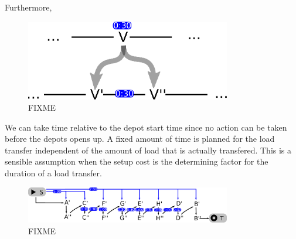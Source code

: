 

Furthermore,

\begin{figure}[!h]
  \centering
    \includegraphics[width=0.8\textwidth]{img/pert.pdf}
  \caption{FIXME}
  \label{fig:duplication}
\end{figure}

We can take time relative to the depot start time since no action can be taken before the depots opens up.
A fixed amount of time is planned for the load transfer independent of the amount of load that is actually transfered.
This is a sensible assumption when the setup cost is the determining factor
for the duration of a load transfer.




\begin{figure}[!h]
  \centering
    \includegraphics[width=0.8\textwidth]{img/example_time_duplicates_nozero.pdf}
  \caption{FIXME}
  \label{fig:longest_path}
\end{figure}



